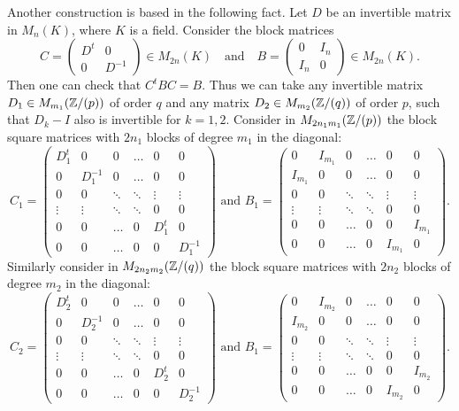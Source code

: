 Another construction is based in the following fact. Let $D$ be an invertible matrix in $M_n(K)$, where $K$ is a field. Consider the block matrices
$$C=\left(\begin{array}{cc}
D^t&0\\
0&D^{-1}\end{array}\right)\in M_{2n}(K)\quad\mbox{and}\quad B=\left(\begin{array}{cc}
0&I_n\\
I_n&0\end{array}\right)\in M_{2n}(K).$$
Then one can check that $C^tBC=B$.     
Thus we can take any invertible matrix $D_1\in M_{m_1}(\mathbb{Z}/(p))$ of order $q$ and any matrix $D_2\in M_{m_2}(\mathbb{Z}/(q))$ of order $p$, such that $D_k-I$ also is invertible for $k=1,2$. 
Consider in $M_{2n_1m_1}(\mathbb{Z}/(p))$ the block square matrices with $2n_1$ blocks of degree $m_1$ in the diagonal:
$$C_1=\left(\begin{array}{cccccc}
	D_1^t&0&0&\ldots &0&0\\
	0&D_1^{-1}&0&\ldots &0&0\\
	0&0&\ddots &\ddots &\vdots&\vdots \\
	\vdots&\vdots&\ddots&\ddots&0&0\\
	0&0&\ldots&0&D_1^t&0\\
    0&0&\ldots&0&0&D_1^{-1}\end{array}\right)\mbox{ and } B_1=\left(\begin{array}{cccccc}
	0&I_{m_1}&0&\ldots &0&0\\
	I_{m_1}&0&0&\ldots &0&0\\
	0&0&\ddots&\ddots&\vdots&\vdots\\
	\vdots&\vdots &\ddots &\ddots &0&0\\
	0&0&\ldots&0&0&I_{m_1}\\
	0&0&\ldots&0&I_{m_1}&0
\end{array}\right).$$
Similarly consider in $M_{2n_2m_2}(\mathbb{Z}/(q))$ the block square matrices with $2n_2$ blocks of degree $m_2$ in the diagonal:
$$C_2=\left(\begin{array}{cccccc}
	D_2^t&0&0&\ldots &0&0\\
	0&D_2^{-1}&0&\ldots &0&0\\
	0&0&\ddots &\ddots &\vdots&\vdots \\
	\vdots&\vdots&\ddots&\ddots&0&0\\
	0&0&\ldots&0&D_2^t&0\\
	0&0&\ldots&0&0&D_2^{-1}\end{array}\right)\mbox{ and } B_1=\left(\begin{array}{cccccc}
	0&I_{m_2}&0&\ldots &0&0\\
	I_{m_2}&0&0&\ldots &0&0\\
	0&0&\ddots&\ddots&\vdots&\vdots\\
	\vdots&\vdots &\ddots &\ddots &0&0\\
	0&0&\ldots&0&0&I_{m_2}\\
	0&0&\ldots&0&I_{m_2}&0
\end{array}\right).$$
